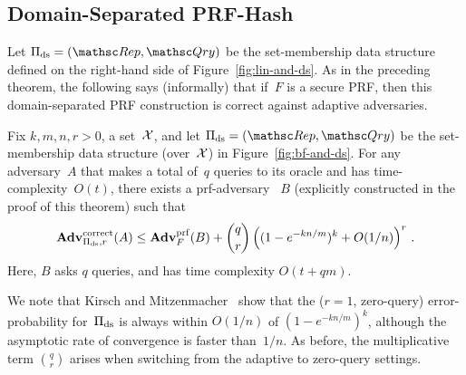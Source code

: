 


\subsection{Domain-Separated PRF-Hash}

 Let $\setprim_{\mathrm{ds}}= (\Rep, \Qry)$
be the set-membership data structure defined on the right-hand side
of Figure~\ref{fig:lin-and-ds}. As in the preceding theorem, the
following says (informally) that if~$F$ is a secure PRF, then this
domain-separated PRF construction is correct against adaptive
adversaries.


\begin{theorem}\label{thm2}\label{thm:ds-correctness}
Fix $k,m,n,r>0$, a set~${\cal X}$, and let $\setprim_{\mathrm{ds}}= (\Rep, \Qry)$ be the set-membership data structure (over~${\cal X}$) in Figure~\ref{fig:bf-and-ds}.  For any adversary~$A$ that makes a total of~$q$ queries to its oracle and has time-complexity~$O(t)$, there exists a prf-adversary ~$B$ (explicitly constructed in the proof of this theorem) such that
\[
\mathrm{\mathbf{Adv}}^{\mathrm{correct}}_{\Pi_{\mathrm{ds}},r}(A) \leq  \mathbf{Adv}^{\mathrm{prf}}_{F}(B)  + {\dbinom{q}{r}} \left( (1-e^{-kn/m})^k + O(1/n) \right)^r\,.
\]
Here, $B$ asks $q$ queries, and has time complexity $O(t+qm)$.
\end{theorem}
We note that Kirsch and Mitzenmacher~\cite{kirsch2006less} show
that the ($r=1$, zero-query) error-probability for~$\Pi_\mathrm{ds}$ is
always within $O(1/n)$ of $(1-e^{-kn/m})^k$, although the asymptotic
rate of convergence is faster than~$1/n$.   As before, the multiplicative term $\binom{q}{r}$ arises when switching from the adaptive to zero-query settings.



